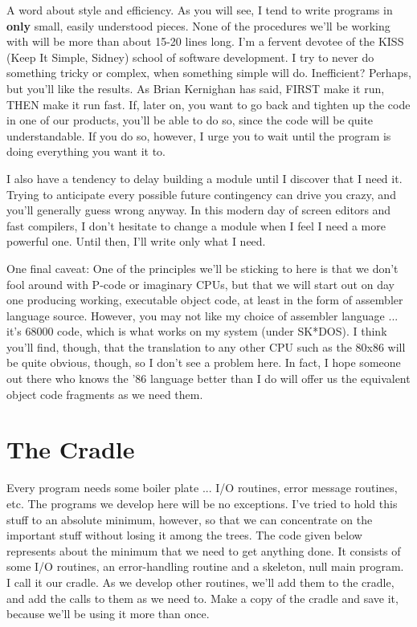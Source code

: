 A word about style and efficiency.  As  you will see, I tend to
write programs in {\bfseries only} small, easily understood pieces.  None
of the procedures we'll  be  working with will be more than about
15-20 lines long.  I'm a fervent devotee  of  the  KISS  (Keep It
Simple, Sidney) school of software development.  I  try  to never
do something tricky or  complex,  when  something simple will do.
Inefficient?  Perhaps, but you'll like the  results.  As  Brian
Kernighan has said,  FIRST  make  it  run, THEN make it run fast.
If, later on,  you want to go back and tighten up the code in one
of  our products, you'll be able to do so, since the code will be
quite understandable. If you  do  so, however, I urge you to wait
until the program is doing everything you want it to.

I  also  have  a  tendency  to  delay  building  a module until I
discover that I need  it.    Trying  to anticipate every possible
future contingency can  drive  you  crazy,  and  you'll generally
guess wrong anyway.    In  this  modern day of screen editors and
fast compilers, I don't hesitate to change a module when I feel I
need a more powerful one.  Until then,  I'll  write  only  what I
need.

One final caveat: One of the principles we'll be sticking to here
is that we don't  fool  around with P-code or imaginary CPUs, but
that we will start out on day one  producing  working, executable
object code, at least in the form of  assembler  language source.
However, you may not  like  my  choice  of assembler language ...
it's 68000 code, which is what works on my system (under SK*DOS).
I  think  you'll  find, though, that the translation to any other
CPU such as the 80x86 will  be  quite obvious, though, so I don't
see  a problem here.  In fact, I hope someone out there who knows
the '86 language better than I do will offer  us  the  equivalent
object code fragments as we need them.


\section{The Cradle}

Every program needs some boiler  plate  ...  I/O  routines, error
message routines, etc.   The  programs we develop here will be no
exceptions.    I've  tried to hold  this  stuff  to  an  absolute
minimum, however, so that we  can  concentrate  on  the important
stuff without losing it  among  the  trees.  The code given below
represents about the minimum that we need to  get  anything done.
It consists of some I/O routines, an error-handling routine and a
skeleton, null main program.   I  call  it  our  cradle.    As we
develop other routines, we'll add them to the cradle, and add the
calls to them as we  need to.  Make a copy of the cradle and save
it, because we'll be using it more than once.

